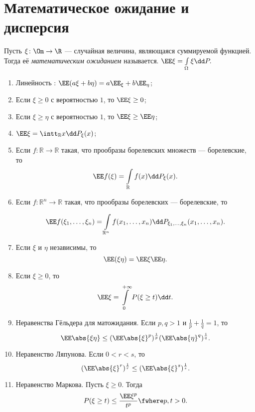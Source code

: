 \section{Математическое ожидание и дисперсия}

 \begin{definition} Пусть $\xi \colon \Om \to \R$ --- случайная величина, являющаяся суммируемой функцией. Тогда её \textit{математическим ожиданием} называется.
     $\EE \xi = \int\limits_\Omega \xi \dd P.$ 
 \end{definition}

 \begin{properties}[матожидания]
\enewline
     \begin{enumerate}
         \item Линейность : $\EE (a\xi +b\eta) = a\EE _\xi + b\EE _\eta$;
         \item Если $\xi \ge0$ с вероятностью $1$, то $\EE \xi\ge0$;
         \item Если $\xi\ge\eta$ с вероятностью $1$, то $\EE \xi\ge \EE \eta$;
         \item $\EE \xi = \intt_\mathbb{R}x\dd P_\xi(x)$;
         \item Если $f\colon \mathbb{R}\rightarrow \mathbb{R}$ такая, что прообразы борелевских множеств --- борелевские, то
               $$\EE f(\xi) = \int\limits_\mathbb{R}f(x)\dd P_\xi(x).$$
         \item Если $f: \mathbb{R}^n\rightarrow \mathbb{R}$ такая, что прообразы борелевских --- борелевские, то

               $$\EE f(\xi_1, \ldots, \xi_n) = \int\limits_{\mathbb{R}^n}f(x_1, \ldots, x_n)\dd P_{\xi_1, \ldots, \xi_n}(x_1, \ldots, x_n).$$


         \item Если $\xi$ и $\eta$ независимы, то 
         $$\EE (\xi\eta) = \EE \xi \EE \eta.$$


         \item Если $\xi \ge 0$, то 
         $$\EE \xi=\int\limits_0^{+\infty} P(\xi\ge t)\dd t.$$ 


         \item Неравенства Гёльдера для матожидания. Если $p, q > 1$ и $\frac{1}{p}+\frac{1}{q} = 1$, то 
         $$\EE \abs{\xi\eta} \le (\EE \abs{\xi}^p)^\frac{1}{p}(\EE \abs{\eta}^q)^\frac{1}{q}.$$

         \item Неравенство Ляпунова. Если $0<r<s$, то
         $$(\EE \abs{\xi}^r)^\frac{1}{r} \le (\EE \abs{\xi}^s)^\frac{1}{s}.$$ 


         \item Неравенство Маркова. Пусть $\xi\ge0$. Тогда
         $$P(\xi\ge t) \le \frac{\EE \xi^p}{t^p}\fwhere p, t > 0.$$

     \end{enumerate}
 \end{properties}
 
